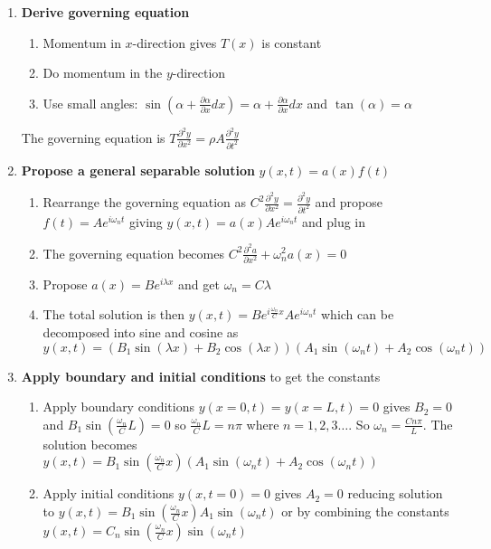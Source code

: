 \begin{enumerate}
  \setlength{\itemsep}{0pt}
  \item{\textbf{Derive governing equation}}
  \begin{enumerate}
    \setlength{\itemsep}{0pt}
    \item{Momentum in $x$-direction gives $T(x)$ is constant}
    \item{Do momentum in the $y$-direction}
    \item{Use small angles: $\sin(\alpha+\frac{\partial\alpha}{\partial{}x}dx)=\alpha+\frac{\partial\alpha}{\partial{}x}dx$ and $\tan(\alpha)=\alpha$}
  \end{enumerate}
  The governing equation is $\boxed{T\frac{\partial^{2}y}{\partial{}x^{2}}=\rho A\frac{\partial^{2}y}{\partial{}t^{2}}}$
  \item{\textbf{Propose a general separable solution} $\boxed{y(x,t)=a(x)f(t)}$}
  \begin{enumerate}
    \setlength{\itemsep}{0pt}
    \item{Rearrange the governing equation as $C^{2}\frac{\partial^{2}y}{\partial{}x^{2}}=\frac{\partial^{2}y}{\partial{}t^{2}}$ and propose $f(t)=Ae^{i\omega_{n}t}$ giving $y(x,t)=a(x)Ae^{i\omega_{n}t}$ and plug in}
    \item{The governing equation becomes $C^{2}\frac{\partial^{2}a}{\partial{}x^{2}}+\omega_{n}^{2}a(x)=0$}
    \item{Propose $a(x)=Be^{i\lambda x}$ and get $\omega_{n}=C\lambda$}
    \item{The total solution is then $\boxed{y(x,t)=Be^{i\frac{\omega_{n}}{C} x}Ae^{i\omega_{n}t}}$ which can be decomposed into sine and cosine as $y(x,t)=(B_{1}\sin(\lambda x)+B_{2}\cos(\lambda x))(A_{1}\sin(\omega_{n}t)+A_{2}\cos(\omega_{n}t))$}
  \end{enumerate}
  \item{\textbf{Apply boundary and initial conditions} to get the constants}
  \begin{enumerate}
    \setlength{\itemsep}{0pt}
    \item{%
      Apply boundary conditions $y(x=0,t)=y(x=L,t)=0$ gives $B_{2}=0$ and $B_{1}\sin(\frac{\omega_{n}}{C}L)=0$ so $\frac{\omega_{n}}{C}L=n\pi$ where $n=1,2,3\dots$.
      So $\omega_{n}=\frac{Cn\pi}{L}$.
      The solution becomes $y(x,t)=B_{1}\sin(\frac{\omega_{n}}{C}x)(A_{1}\sin(\omega_{n}t)+A_{2}\cos(\omega_{n}t))$
    }
    \item{Apply initial conditions $y(x,t=0)=0$ gives $A_{2}=0$ reducing solution to $y(x,t)=B_{1}\sin(\frac{\omega_{n}}{C}x) A_{1}\sin(\omega_{n}t)$ or by combining the constants \newline $\boxed{y(x,t)=C_{n}\sin(\frac{\omega_{n}}{C}x)\sin(\omega_{n}t)}$}

\end{enumerate}
\end{enumerate}
